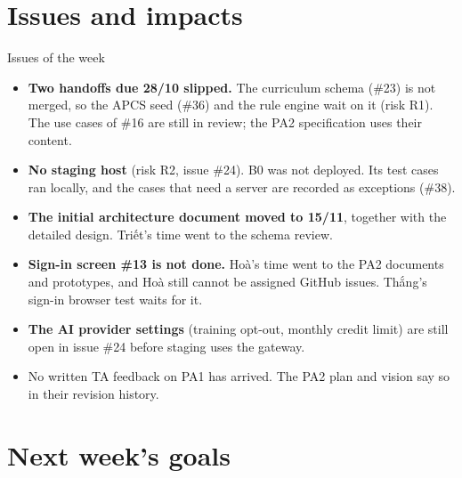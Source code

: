 \documentclass{article}
\begin{document}
\section{Issues and impacts}
\begin{ocnote}{Issues of the week}
\begin{itemize}
  \item \textbf{Two handoffs due 28/10 slipped.} The curriculum schema (\#23) is not merged, so the APCS seed (\#36) and the
        rule engine wait on it (risk R1). The use cases of \#16 are still in review; the PA2 specification uses their
        content.
  \item \textbf{No staging host} (risk R2, issue \#24). B0 was not deployed. Its test cases ran locally, and the cases that
        need a server are recorded as exceptions (\#38).
  \item \textbf{The initial architecture document moved to 15/11}, together with the detailed design. Triết's time went to
        the schema review.
  \item \textbf{Sign-in screen \#13 is not done.} Hoà's time went to the PA2 documents and prototypes, and Hoà still cannot
        be assigned GitHub issues. Thắng's sign-in browser test waits for it.
  \item \textbf{The AI provider settings} (training opt-out, monthly credit limit) are still open in issue \#24 before
        staging uses the gateway.
  \item No written TA feedback on PA1 has arrived. The PA2 plan and vision say so in their revision history.
\end{itemize}
\end{ocnote}

\section{Next week's goals}
\end{document}

